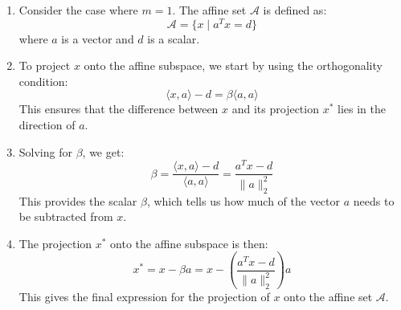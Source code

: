         \begin{example}
            \begin{enumerate}
                \item Consider the case where \( m = 1 \). The affine set \( \mathcal{A} \) is defined as:
                \[
                \mathcal{A} = \{ x \mid a^T x = d \}
                \]
                where \( a \) is a vector and \( d \) is a scalar.
            
                \item To project \( x \) onto the affine subspace, we start by using the orthogonality condition:
                \[
                \langle x, a \rangle - d = \beta \langle a, a \rangle
                \]
                This ensures that the difference between \( x \) and its projection \( x^* \) lies in the direction of \( a \).
            
                \item Solving for \( \beta \), we get:
                \[
                \beta = \frac{\langle x, a \rangle - d}{\langle a, a \rangle} = \frac{a^T x - d}{\| a \|_2^2}
                \]
                This provides the scalar \( \beta \), which tells us how much of the vector \( a \) needs to be subtracted from \( x \).
            
                \item The projection \( x^* \) onto the affine subspace is then:
                \[
                x^* = x - \beta a = x - \left( \frac{a^T x - d}{\| a \|_2^2} \right) a
                \]
                This gives the final expression for the projection of \( x \) onto the affine set \( \mathcal{A} \).
            \end{enumerate}            
        \end{example}

